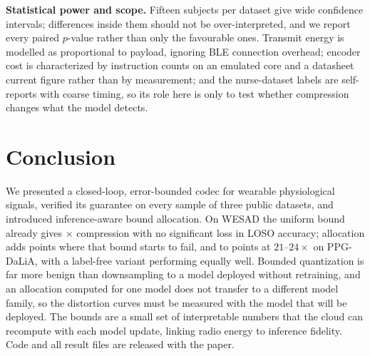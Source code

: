 \documentclass[journal]{IEEEtran}
\begin{document}
\textbf{Statistical power and scope.} Fifteen subjects per dataset give wide confidence intervals; differences inside them should not be over-interpreted, and we report every paired $p$-value rather than only the favourable ones. Transmit energy is modelled as proportional to payload, ignoring BLE connection overhead; encoder cost is characterized by instruction counts on an emulated core and a datasheet current figure rather than by measurement; and the nurse-dataset labels are self-reports with coarse timing, so its role here is only to test whether compression changes what the model detects.

\section{Conclusion}
We presented a closed-loop, error-bounded codec for wearable physiological signals, verified its guarantee on every sample of three public datasets, and introduced inference-aware bound allocation. On WESAD the uniform bound already gives \ratioEe$\times$ compression with no significant loss in LOSO accuracy; allocation adds \allocClfDiffBA{} points where that bound starts to fail, and \daliaallocClfDiffBA{} to \daliaallocClfDiffBD{} points at $21$--$24\times$ on PPG-DaLiA, with a label-free variant performing equally well. Bounded quantization is far more benign than downsampling to a model deployed without retraining, and an allocation computed for one model does not transfer to a different model family, so the distortion curves must be measured with the model that will be deployed. The bounds are a small set of interpretable numbers that the cloud can recompute with each model update, linking radio energy to inference fidelity. Code and all result files are released with the paper.
\end{document}
